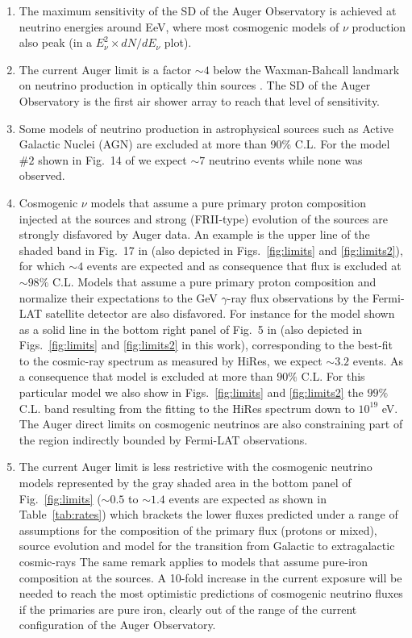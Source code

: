 \documentclass[reprint,showpacs,showkeys,amsmath,amssymb,aps,nofootinbib]{revtex4-1}
\begin{document}
\begin{enumerate}

\item
The maximum sensitivity of the SD of the Auger Observatory is achieved
at neutrino energies around EeV, where most cosmogenic models
of $\nu$ production also peak (in a $E_\nu^2 \times dN/dE_\nu$ plot). 

\item
The current Auger limit is a factor $\sim4$ below the Waxman-Bahcall landmark on neutrino 
production in optically thin sources \cite{WB}. The SD of the Auger Observatory
is the first air shower array to reach that level of sensitivity. 

\item
Some models of neutrino production in astrophysical sources 
such as Active Galactic Nuclei (AGN) are excluded at more than 90\% C.L.   
For the model $\#2$ shown in Fig.~14 of \cite{Becker_AGN} 
we expect ${\sim} 7$ neutrino events while none was observed.  

\item
Cosmogenic $\nu$ models that assume a pure primary proton composition injected at the sources
and strong (FRII-type) evolution of the sources are strongly disfavored by Auger data. 
An example is the upper line of the shaded band in 
Fig.~17 in \cite{Kampert_GZK} (also depicted in Figs.~\ref{fig:limits} and \ref{fig:limits2}), 
for which ${\sim} 4$ events are expected
and as consequence that flux is excluded at ${\sim}98\%$ C.L.
Models that assume a pure primary proton composition and normalize their
expectations to the GeV $\gamma$-ray flux observations by the Fermi-LAT satellite detector are also disfavored. 
For instance for the model shown as a solid line in the bottom right panel of Fig.~5 in \cite{Ahlers_GZK}
(also depicted in Figs.~\ref{fig:limits} and \ref{fig:limits2} in this work),  
corresponding to the best-fit to the cosmic-ray spectrum as measured by HiRes,
we expect ${\sim} 3.2$ events. As a consequence that model is excluded at more than $90\%$ C.L.
For this particular model we also show in Figs.~\ref{fig:limits} and \ref{fig:limits2} the $99\%$ C.L. 
band resulting from the fitting to the HiRes spectrum down to $10^{19}$ eV. 
The Auger direct limits on cosmogenic neutrinos 
are also constraining part of the region indirectly bounded by Fermi-LAT observations.

\item
The current Auger limit is less restrictive with the cosmogenic neutrino 
models represented by the gray shaded area in the bottom panel of Fig.~\ref{fig:limits}
(${\sim} 0.5$ to ${\sim} 1.4$ events are expected as shown in Table~\ref{tab:rates})
which brackets the lower fluxes predicted under a 
range of assumptions for the composition of the
primary flux (protons or mixed), source evolution and model for
the transition from Galactic to extragalactic cosmic-rays \cite{Kotera_GZK}
The same remark applies to models
that assume pure-iron composition at the sources. 
A 10-fold increase in the current exposure will be
needed to reach the most optimistic predictions
of cosmogenic neutrino fluxes if the primaries are 
pure iron, clearly out of the range of the current 
configuration of the Auger Observatory. 


\end{enumerate}
\end{document}
